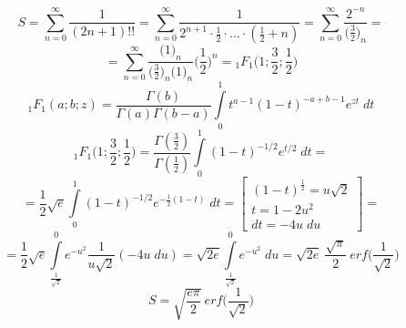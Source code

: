 


	$$S = \sum_{n= 0}^{\infty} \frac{1}{(2n+1)!!} =  \sum_{n= 0}^{\infty} \frac{1}{2^{n+1} \cdot \frac{1}{2} \cdot ... \cdot (\frac{1}{2}+n)} = \sum_{n= 0}^{\infty} \frac{2^{-n}}{\Big(\frac{3}{2}\Big)_n} =$$
	$$= \sum_{n= 0}^{\infty} \frac{\big(1\big)_n}{\big(\frac{3}{2}\big)_n \big(1\big)_n} \Big(\frac{1}{2}\Big)^n = {}_1F_1 \Big(1; \frac{3}{2}; \frac{1}{2}\Big) $$
	$${}_1F_1 (a; b; z) = \frac{\Gamma(b)}{\Gamma(a) \Gamma(b-a)} \int \limits_0^1 t^{a-1} (1-t)^{-a+b-1} e^{zt }\; dt$$
	$$ {}_1F_1 \Big(1; \frac{3}{2}; \frac{1}{2}\Big)  = \frac{\Gamma(\frac{3}{2})}{\Gamma(\frac{1}{2})} \int \limits_0^1 (1-t)^{-1/2} e^{t/2}\; dt = $$
	$$= \frac{1}{2} \sqrt{e} \int \limits_0^1 (1-t)^{-1/2} e^{-\frac{1}{2}(1-t)}\; dt = \left[ \begin{array}{c}
		(1-t)^{\frac{1}{2}} = u \sqrt{2} \\
		t = 1 - 2 u^2 \\
		dt = -4u \; du
	\end{array}\right] =$$
	$$= \frac{1}{2} \sqrt{e} \int \limits_{\frac{1}{\sqrt{2}}}^0 e^{-u^2} \frac{1}{u\sqrt{2}} (-4u \; du) = \sqrt{2 e} \int \limits_{\frac{1}{\sqrt{2}}}^0 e^{-u^2}  \; du = \sqrt{2 e} \: \frac{\sqrt{\pi}}{2} \: erf\Big(\frac{1}{\sqrt{2}}\Big)$$
	$$S = \sqrt{\frac{e \pi}{2}} \: erf\Big(\frac{1}{\sqrt{2}}\Big)$$
	
	
